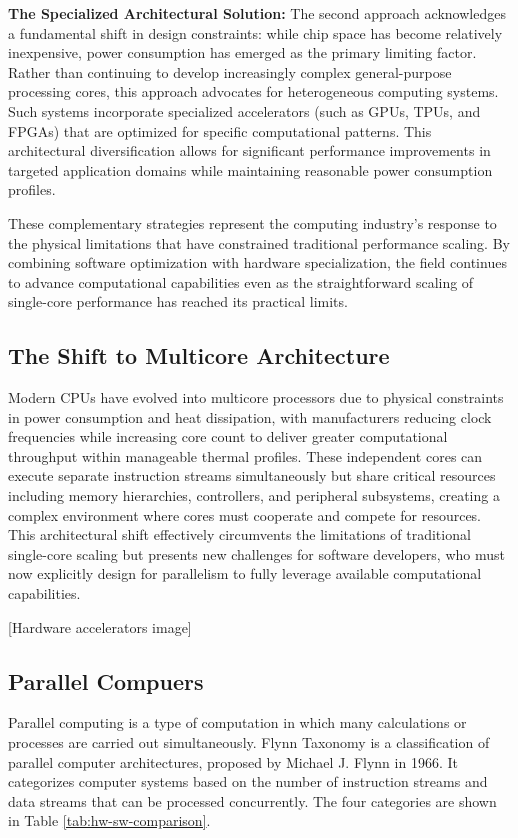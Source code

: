 \textbf{The Specialized Architectural Solution:} The second approach acknowledges a fundamental shift in design constraints: while chip space has become relatively inexpensive, power consumption has emerged as the primary limiting factor. Rather than continuing to develop increasingly complex general-purpose processing cores, this approach advocates for heterogeneous computing systems. Such systems incorporate specialized accelerators (such as GPUs, TPUs, and FPGAs) that are optimized for specific computational patterns. This architectural diversification allows for significant performance improvements in targeted application domains while maintaining reasonable power consumption profiles.

These complementary strategies represent the computing industry's response to the physical limitations that have constrained traditional performance scaling. By combining software optimization with hardware specialization, the field continues to advance computational capabilities even as the straightforward scaling of single-core performance has reached its practical limits.

\subsection{The Shift to Multicore Architecture}

Modern CPUs have evolved into multicore processors due to physical constraints in power consumption and heat dissipation, with manufacturers reducing clock frequencies while increasing core count to deliver greater computational throughput within manageable thermal profiles. These independent cores can execute separate instruction streams simultaneously but share critical resources including memory hierarchies, controllers, and peripheral subsystems, creating a complex environment where cores must cooperate and compete for resources. This architectural shift effectively circumvents the limitations of traditional single-core scaling but presents new challenges for software developers, who must now explicitly design for parallelism to fully leverage available computational capabilities.

[Hardware accelerators image]

\subsection{Parallel Compuers}

Parallel computing is a type of computation in which many calculations or processes are carried out simultaneously. Flynn Taxonomy is a classification of parallel computer architectures, proposed by Michael J. Flynn in 1966. It categorizes computer systems based on the number of instruction streams and data streams that can be processed concurrently. The four categories are shown in Table \ref{tab:hw-sw-comparison}.


